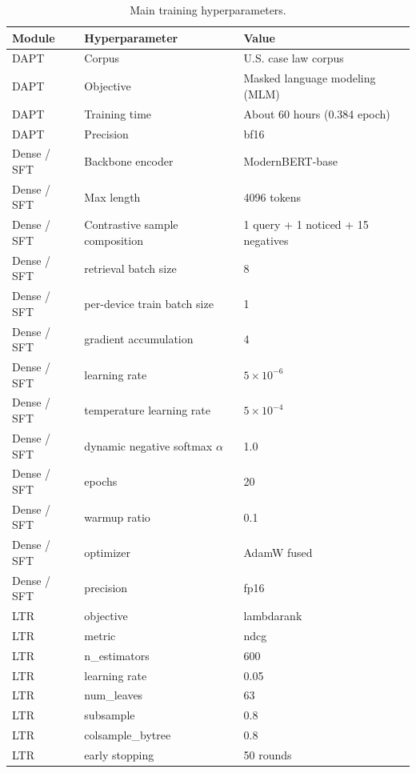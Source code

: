 \begin{table}[t]
  \centering
  \scriptsize
  \begin{tabular}{lll}
    \toprule
    Module & Hyperparameter & Value \\
    \midrule
    DAPT & Corpus & U.S. case law corpus \\
    DAPT & Objective & Masked language modeling (MLM) \\
    DAPT & Training time & About 60 hours (0.384 epoch) \\
    DAPT & Precision & bf16 \\
    Dense / SFT & Backbone encoder & ModernBERT-base \\
    Dense / SFT & Max length & 4096 tokens \\
    Dense / SFT & Contrastive sample composition & 1 query + 1 noticed + 15 negatives \\
    Dense / SFT & retrieval batch size & 8 \\
    Dense / SFT & per-device train batch size & 1 \\
    Dense / SFT & gradient accumulation & 4 \\
    Dense / SFT & learning rate & $5\times10^{-6}$ \\
    Dense / SFT & temperature learning rate & $5\times10^{-4}$ \\
    Dense / SFT & dynamic negative softmax $\alpha$ & 1.0 \\
    Dense / SFT & epochs & 20 \\
    Dense / SFT & warmup ratio & 0.1 \\
    Dense / SFT & optimizer & AdamW fused \\
    Dense / SFT & precision & fp16 \\
    LTR & objective & lambdarank \\
    LTR & metric & ndcg \\
    LTR & n\_estimators & 600 \\
    LTR & learning rate & 0.05 \\
    LTR & num\_leaves & 63 \\
    LTR & subsample & 0.8 \\
    LTR & colsample\_bytree & 0.8 \\
    LTR & early stopping & 50 rounds \\
    \bottomrule
  \end{tabular}
  \caption{Main training hyperparameters.}
  \label{tab:train-hparams}
\end{table}

